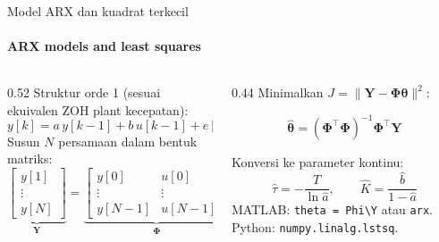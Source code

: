 \documentclass[aspectratio=169,10pt]{beamer}
\begin{document}
\begin{frame}{Model ARX dan kuadrat terkecil}
	\framesubtitle{ARX models and least squares}
	\begin{columns}[T]
		\begin{column}{0.52\textwidth}
			\small
			Struktur orde 1 (sesuai ekuivalen ZOH plant kecepatan):
			\[
				y[k] = a\,y[k-1] + b\,u[k-1] + e[k]
			\]
			Susun $N$ persamaan dalam bentuk matriks:
			\[
				\underbrace{\begin{bmatrix} y[1]\\ \vdots\\ y[N]\end{bmatrix}}_{\mathbf{Y}}
				=
				\underbrace{\begin{bmatrix} y[0] & u[0]\\ \vdots & \vdots\\ y[N-1] & u[N-1]\end{bmatrix}}_{\boldsymbol{\Phi}}
				\underbrace{\begin{bmatrix} a\\ b\end{bmatrix}}_{\boldsymbol\theta}
				+ \mathbf{e}
			\]
		\end{column}
		\begin{column}{0.44\textwidth}
			\small
			Minimalkan $J = \|\mathbf{Y} - \boldsymbol\Phi\boldsymbol\theta\|^2$:
			\begin{block}{}
				\[
					\hat{\boldsymbol\theta} = (\boldsymbol\Phi^\top\boldsymbol\Phi)^{-1}\boldsymbol\Phi^\top\mathbf{Y}
				\]
			\end{block}
			Konversi ke parameter kontinu:
			\[
				\hat\tau = -\frac{T}{\ln\hat a},\qquad \hat K = \frac{\hat b}{1-\hat a}
			\]
			{\scriptsize MATLAB: \texttt{theta = Phi\textbackslash Y} atau \texttt{arx}. Python: \texttt{numpy.linalg.lstsq}.}
		\end{column}
	\end{columns}
\end{frame}
\end{document}
